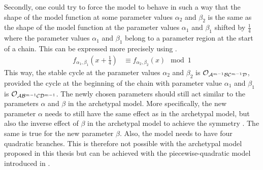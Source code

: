 Secondly, one could try to force the model to behave in such a way that the shape of the model function at some parameter values $\alpha_2$ and $\beta_2$ is the same as the shape of the model function at the parameter values $\alpha_1$ and $\beta_1$ shifted by $\frac{1}{4}$ where the parameter values $\alpha_1$ and $\beta_1$ belong to a parameter region at the start of a chain.
This can be expressed more precisely using .
\begin{align}
	f_{\alpha_1, \beta_1}\left(x + \frac{1}{4}\right) & \equiv f_{\alpha_2, \beta_2}(x) \mod 1
	\label{equ:arch.dyn.shift}
\end{align}
This way, the stable cycle at the parameter values $\alpha_2$ and $\beta_2$ is $\mathcal{O}_{\mathcal{A}^{m-1}\mathcal{B}\mathcal{C}^{m-1}\mathcal{D}}$, provided the cycle at the beginning of the chain with parameter value $\alpha_1$ and $\beta_1$ is $\mathcal{O}_{\mathcal{A}\mathcal{B}^{m-1}\mathcal{C}\mathcal{D}^{m-1}}$.
The newly chosen parameters should still act similar to the parameters $\alpha$ and $\beta$ in the archetypal model.
More specifically, the new parameter $\alpha$ needs to still have the same effect as in the archetypal model, but also the inverse effect of $\beta$ in the archetypal model to achieve the symmetry .
The same is true for the new parameter $\beta$.
Also, the model needs to have four quadratic branches.
This is therefore not possible with the archetypal model proposed in this thesis but can be achieved with the piecewise-quadratic model introduced in .
